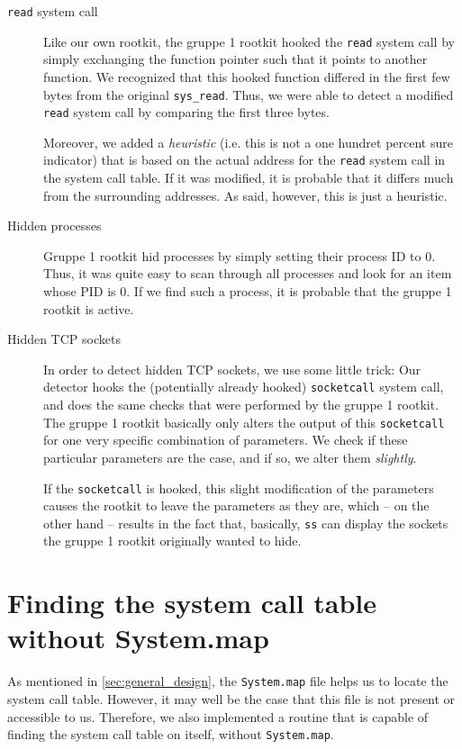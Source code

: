 \documentclass[10pt, letterpaper]{scrartcl}
\begin{document}
\begin{description}
\item[\texttt{read} system call] Like our own rootkit, the gruppe 1 rootkit hooked the \texttt{read} system call by simply exchanging the function pointer such that it points to another function. We recognized that this hooked function differed in the first few bytes from the original \texttt{sys\_read}. Thus, we were able to detect a modified \texttt{read} system call by comparing the first three bytes.

Moreover, we added a \emph{heuristic} (i.e. this is not a one hundret percent sure indicator) that is based on the actual address for the \texttt{read} system call in the system call table. If it was modified, it is probable that it differs much from the surrounding addresses. As said, however, this is just a heuristic.
\item[Hidden processes] Gruppe 1 rootkit hid processes by simply setting their process ID to 0. Thus, it was quite easy to scan through all processes and look for an item whose PID is 0. If we find such a process, it is probable that the gruppe 1 rootkit is active.
\item[Hidden TCP sockets] In order to detect hidden TCP sockets, we use some little trick: Our detector hooks the (potentially already hooked) \texttt{socketcall} system call, and does the same checks that were performed by the gruppe 1 rootkit. The gruppe 1 rootkit basically only alters the output of this \texttt{socketcall} for one very specific combination of parameters. We check if these particular parameters are the case, and if so, we alter them \emph{slightly}. 

If the \texttt{socketcall} is hooked, this slight modification of the parameters causes the rootkit to leave the parameters as they are, which -- on the other hand -- results in the fact that, basically, \texttt{ss} can display the sockets the gruppe 1 rootkit originally wanted to hide.
\end{description}

\section{Finding the system call table without System.map}
\label{sec:syscalltable-without-system-map}

As mentioned in \autoref{sec:general_design}, the \texttt{System.map} file helps us to locate the system call table. However, it may well be the case that this file is not present or accessible to us. Therefore, we also implemented a routine that is capable of finding the system call table on itself, without \texttt{System.map}.
\end{document}
